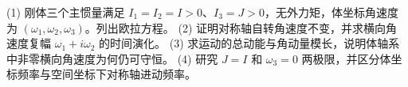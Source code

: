 (1) 刚体三个主惯量满足 \(I_1=I_2=I>0\)、\(I_3=J>0\)，无外力矩，体坐标角速度为 \((\omega_1,\omega_2,\omega_3)\)。列出欧拉方程。
(2) 证明对称轴自转角速度不变，并求横向角速度复幅 \(\omega_1+i\omega_2\) 的时间演化。
(3) 求运动的总动能与角动量模长，说明体轴系中非零横向角速度为何仍可守恒。
(4) 研究 \(J=I\) 和 \(\omega_3=0\) 两极限，并区分体坐标频率与空间坐标下对称轴进动频率。
